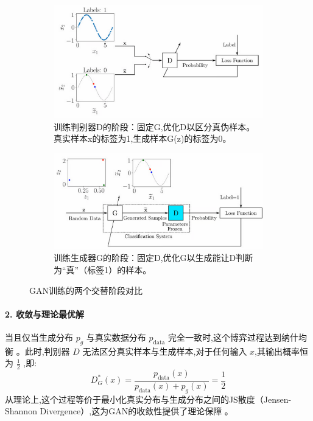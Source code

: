 \begin{itemize}
    \begin{figure}[H]
        \centering
        \begin{subfigure}[b]{0.48\textwidth}
            \centering
            \includegraphics[width=\textwidth]{figures/GAN5.png}
            \caption{训练判别器D的阶段：固定G,优化D以区分真伪样本。真实样本x的标签为1,生成样本G(z)的标签为0。}
            \label{fig:gan_train_discriminator}
        \end{subfigure}
        \hfill
        \begin{subfigure}[b]{0.48\textwidth}
            \centering
            \includegraphics[width=\textwidth]{figures/GAN6.png}
            \caption{训练生成器G的阶段：固定D,优化G以生成能让D判断为“真”（标签1）的样本。}
            \label{fig:gan_train_generator}
        \end{subfigure}
        \caption{GAN训练的两个交替阶段对比}
        \label{fig:gan_training_phases}
    \end{figure}

    \paragraph{2. 收敛与理论最优解}
    当且仅当生成分布 $p_g$ 与真实数据分布 $p_{\text{data}}$ 完全一致时,这个博弈过程达到纳什均衡 \cite{89}。此时,判别器 $D$ 无法区分真实样本与生成样本,对于任何输入 $x$,其输出概率恒为 $\frac{1}{2}$ ,即:
    $$ D_{G}^{*}(x) = \frac{p_{\text{data}}(x)}{p_{\text{data}}(x) + p_{g}(x)} = \frac{1}{2} $$
    从理论上,这个过程等价于最小化真实分布与生成分布之间的JS散度（Jensen-Shannon Divergence）,这为GAN的收敛性提供了理论保障 \cite{90}。
    

\end{itemize}
